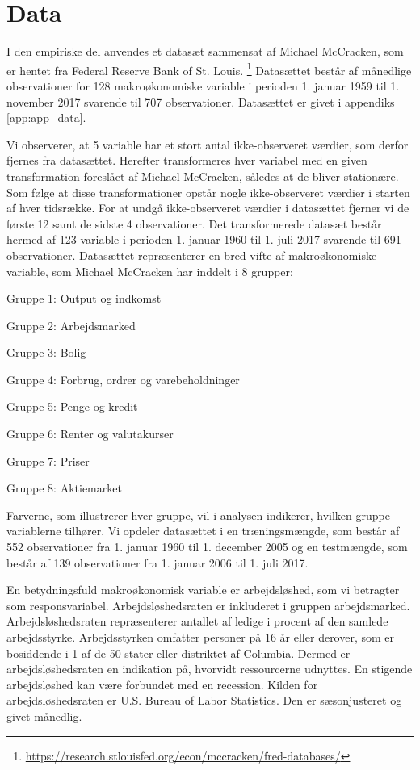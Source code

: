 \chapter{Data} \label{ch:data}
I den empiriske del anvendes et datasæt sammensat af Michael McCracken, som er hentet fra Federal Reserve Bank of St. Louis. \footnote{\url{https://research.stlouisfed.org/econ/mccracken/fred-databases/}}
Datasættet består af månedlige observationer for 128 makroøkonomiske variable i perioden 1. januar 1959 til 1. november 2017 svarende til 707 observationer.
Datasættet er givet i appendiks \ref{app:app_data}.

Vi observerer, at 5 variable har et stort antal ikke-observeret værdier, som derfor fjernes fra datasættet.
Herefter transformeres hver variabel med en given transformation foreslået af Michael McCracken, således at de bliver stationære.
Som følge at disse transformationer opstår nogle ikke-observeret værdier i starten af hver tidsrække.
For at undgå ikke-observeret værdier i datasættet fjerner vi de første 12 samt de sidste 4 observationer.
Det transformerede datasæt består hermed af 123 variable i perioden 1. januar 1960 til 1. juli 2017 svarende til 691 observationer.
Datasættet repræsenterer en bred vifte af makroøkonomiske variable, som Michael McCracken har inddelt i 8 grupper:
%
\begin{description}
\item Gruppe 1: Output og indkomst 
\item Gruppe 2: Arbejdsmarked 
\item Gruppe 3: Bolig 
\item Gruppe 4: Forbrug, ordrer og varebeholdninger  
\item Gruppe 5: Penge og kredit 
\item Gruppe 6: Renter og valutakurser 
\item Gruppe 7: Priser 
\item Gruppe 8: Aktiemarket 
\end{description} 
%
Farverne, som illustrerer hver gruppe, vil i analysen indikerer, hvilken gruppe variablerne tilhører.
Vi opdeler datasættet i en træningsmængde, som består af 552 observationer fra 1. januar 1960 til 1. december 2005 og en testmængde, som består af 139 observationer fra 1. januar 2006 til 1. juli 2017. 

En betydningsfuld makroøkonomisk variable er arbejdsløshed, som vi betragter som responsvariabel.  
Arbejdsløshedsraten er inkluderet i gruppen arbejdsmarked.
Arbejdsløshedsraten repræsenterer antallet af ledige i procent af den samlede arbejdsstyrke.
Arbejdsstyrken omfatter personer på 16 år eller derover, som er bosiddende i 1 af de 50 stater eller distriktet af Columbia.
Dermed er arbejdsløshedsraten en indikation på, hvorvidt ressourcerne udnyttes.
En stigende arbejdsløshed kan være forbundet med en recession.
Kilden for arbejdsløshedsraten er U.S. Bureau of Labor Statistics.
Den er sæsonjusteret og givet månedlig.

